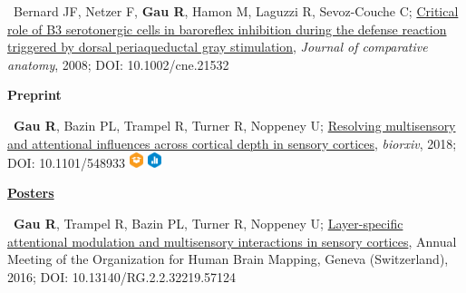 \documentclass[a4paper,12pt,oneside]{letter}
\begin{document}
{\textbullet~Bernard JF, Netzer F, \textbf{Gau R}, Hamon M, Laguzzi R, Sevoz-Couche C; 
\href{http://www.researchgate.net/profile/Remi_Gau/publication/5856955_Critical_role_of_B3_serotonergic_cells_in_baroreflex_inhibition_during_the_defense_reaction_triggered_by_dorsal_periaqueductal_gray_stimulation/links/586bf81d08ae6eb871bb6f47.pdf}{Critical role of B3 serotonergic cells in baroreflex inhibition during the defense reaction triggered by dorsal periaqueductal gray stimulation}, \textit{Journal of comparative anatomy}, 2008; DOI: 10.1002/cne.21532

\begin{center}
 \large\textbf{Preprint}
 \end{center}
 
 \textbullet~\textbf{Gau R}, Bazin PL, Trampel R, Turner R, Noppeney U; \href{https://www.biorxiv.org/content/10.1101/548933v1}{Resolving multisensory and attentional influences across cortical depth in sensory cortices}, \textit{biorxiv}, 2018; DOI: 10.1101/548933 \href{https://github.com/Remi-Gau/AV-Attention-7T_code}{\includegraphics[width=0.4cm]{materials_small_color.png}} \href{https://osf.io/7ka5j/}{\includegraphics[width=0.4cm]{data_small_color.png}}
 



\begin{center}
 \href{https://osf.io/xgdh7/}{\large\textbf{Posters}}
\end{center}

\textbullet~\textbf{Gau R}, Trampel R, Bazin PL, Turner R, Noppeney U; \href{http://www.researchgate.net/profile/Remi_Gau/publication/312040907_Layer-specific_attentional_modulation_and_multisensory_interactions_in_sensory_cortices/links/586bec8108ae8fce4919e07e.pdf?origin=publication_detail&ev=pub_int_prw_xdl&msrp=ebfE-ttTbrYfVzAofje5aX7FDjiW85HC3yqk8seJjhsOoLqmeRviQBtfDuXmv_czDArKxDp2vM32swxlbQzyvbVTbKL6xRpsEZ-BeqgslOo.KWD8vv500DrprbLnXSrDxinWDQrliScdbic1rjyyqLUG12KOwbjri9jbFDwSYWMkGLoSocKyAei7eQLoDCU9Dw.4eQVGmpcVG-AAQDI4KiYt-xA9SDkF_u7xvWOznoi52trnfagq5aJVIAgpfhgitdzt3LYuUPdJ8gE6jmG5I94Nw}{Layer-specific attentional modulation and multisensory interactions in sensory cortices}, Annual Meeting of the Organization for Human Brain Mapping, Geneva (Switzerland), 2016; DOI: 10.13140/RG.2.2.32219.57124

}
\end{document}
